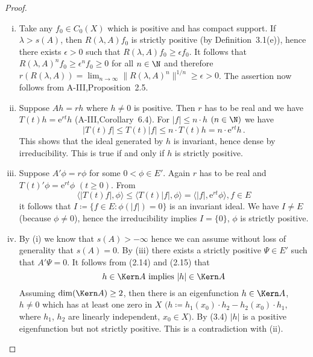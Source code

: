 \begin{proof} 
\begin{enumerate}[(i), wide]
	\item 
	Take any $f_{0} \in C_{0}(X)$ which is positive and has compact support.
	If $\lambda > s(A)$, then $R(\lambda,A)f_{0}$ is strictly positive (by Definition~3.1(e)), hence there exists $\epsilon > 0$ such that $R(\lambda,A)f_{0} \geq \epsilon f_{0}$.
	It follows that $R(\lambda,A)^nf_{0} \geq \epsilon^nf_{0} \geq 0$ for all $n \in \N$ and therefore
%
%
%		
	$r(R(\lambda,A)) = \lim_{n \to \infty}\|R(\lambda,A)^{n}\|^{1/n} \geq \epsilon > 0 $.
	The assertion now follows from A-III,Proposition~2.5.
	

	\item 
	Suppose $Ah = rh$ where $h \neq 0$ is positive.
	Then $r$ has to be real and we have $T(t)h = \mathrm{e}^{rt}h$ (A-III,Corollary~6.4).
	For $|f| \leq n\cdot h$ $(n \in \N)$ we have
	\begin{equation}\label{eq:b3-3.2}
		|T(t)f| \leq T(t)|f| \leq n\cdot T(t)h = n\cdot \mathrm{e}^{rt}h\,.		
	\end{equation}
		This shows that the ideal generated by $h$ is invariant, hence dense by irreducibility.
	This is true if and only if $h$ is strictly positive.
	
	\item 
	Suppose $A'\phi = r\phi$ for some $0 < \phi \in E'$.
	Again $r$ has to be real and $T(t)'\phi = \mathrm{e}^{rt}\phi$ $(t \geq 0)$.
	From
	\begin{equation}\label{eq:b3-3.3}
	\langle|T(t)f|,\phi\rangle \leq \langle T(t)|f|,\phi\rangle = \langle|f|,\mathrm{e}^{rt}\phi\rangle, f \in E			
	\end{equation}
	it follows that $I \coloneq \{f \in E : \phi(|f|) = 0\}$ is an invariant ideal.
	We have $I \neq E$ (because $\phi \neq 0$), hence the irreducibility implies $I = \{0\}$, \ie $\phi$ is strictly positive.
	
	\item 
	By (i) we know that $s(A) > -\infty$ hence we can assume without loss of generality that $s(A) = 0$.
	By (iii) there exists a strictly positive $\Psi \in E'$ such that $A'\Psi = 0$.
	It follows from (2.14) and (2.15) that
	\begin{equation}\label{eq:b3-3.4}
	h \in \Kern A \text{ implies } |h| \in \Kern A
	\end{equation}
	Assuming $\dim(\Kern A) \geq 2$, then there is an eigenfunction $h \in \Kern A$, $h \neq 0$ which has at least one zero in $X$ $(h \coloneq h_{1}(x_{0})\cdot h_{2} - h_{2}(x_{0})\cdot h_{1}$, where $h_{1}$, $h_{2}$ are linearly independent, $x_{0} \in X)$.
	By (3.4) $|h|$ is a positive eigenfunction but not strictly positive.
	This is a contradiction with (ii).
	

\end{enumerate}
\end{proof}
